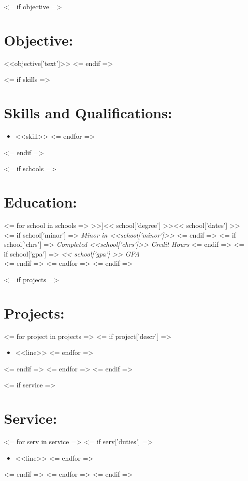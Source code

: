 \documentclass{resume}
\author{ <<author>> }
\begin{document}
\maketitle

<= if objective =>
\section{Objective:}

\small <<objective['text']>> \normalsize
<= endif =>

<= if skills =>
\section{Skills and Qualifications:}
\small\begin{itemize}
<= for skill in skills =>
    \item <<skill>>
<= endfor =>
\end{itemize}\normalsize
<= endif =>

<= if schools =>
    \section{Education:}
    <= for school in schools =>
        \affiliation[<< school['place'] >>]{<< school['degree'] >>}{<< school['dates'] >>}
        <= if school['minor'] =>
            \textit{Minor in <<school['minor']>>}
        <= endif =>
        <= if school['chrs'] =>
            \textit{Completed <<school['chrs']>> Credit Hours}
        <= endif =>
        <= if school['gpa'] =>
            \emph{ << school['gpa'] >> GPA}\\
        <= endif =>
    <= endfor =>
<= endif =>

<= if projects =>
    \section{Projects:}
    <= for project in projects =>
        <= if project['descr'] =>
            \small\begin{itemize}
            <= for line in project['descr'] =>
                \item <<line>>
            <= endfor =>
            \end{itemize}\normalsize
        <= endif =>
    <= endfor =>
<= endif =>

<= if service =>
    \section{Service:}
    <= for serv in service =>
        <= if serv['duties'] =>
            \small\begin{itemize}
            <= for line in serv['duties'] =>
                \item <<line>>
            <= endfor =>
            \end{itemize}\normalsize
        <= endif =>
    <= endfor =>
<= endif =>
\end{document}
